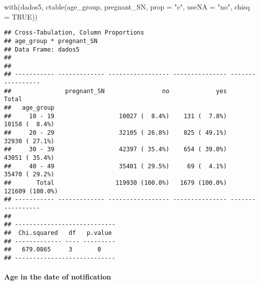 \documentclass[
]{article}
\newenvironment{Shaded}{\begin{snugshade}}{\end{snugshade}}
\newcommand{\AttributeTok}[1]{\textcolor[rgb]{0.77,0.63,0.00}{#1}}
\newcommand{\ConstantTok}[1]{\textcolor[rgb]{0.00,0.00,0.00}{#1}}
\newcommand{\DecValTok}[1]{\textcolor[rgb]{0.00,0.00,0.81}{#1}}
\newcommand{\FunctionTok}[1]{\textcolor[rgb]{0.00,0.00,0.00}{#1}}
\newcommand{\NormalTok}[1]{#1}
\newcommand{\OtherTok}[1]{\textcolor[rgb]{0.56,0.35,0.01}{#1}}
\newcommand{\SpecialCharTok}[1]{\textcolor[rgb]{0.00,0.00,0.00}{#1}}
\newcommand{\StringTok}[1]{\textcolor[rgb]{0.31,0.60,0.02}{#1}}
\begin{document}
\begin{Shaded}
\begin{Highlighting}[]
\FunctionTok{with}\NormalTok{(dados5, }\FunctionTok{ctable}\NormalTok{(age\_group, pregnant\_SN, }\AttributeTok{prop =} \StringTok{"c"}\NormalTok{, }\AttributeTok{useNA =} \StringTok{"no"}\NormalTok{, }\AttributeTok{chisq =} \ConstantTok{TRUE}\NormalTok{))}
\end{Highlighting}
\end{Shaded}

\begin{verbatim}
## Cross-Tabulation, Column Proportions  
## age_group * pregnant_SN  
## Data Frame: dados5  
## 
## 
## ----------- ------------- ----------------- --------------- -----------------
##               pregnant_SN                no             yes             Total
##   age_group                                                                  
##     10 - 19                  10027 (  8.4%)    131 (  7.8%)    10158 (  8.4%)
##     20 - 29                  32105 ( 26.8%)    825 ( 49.1%)    32930 ( 27.1%)
##     30 - 39                  42397 ( 35.4%)    654 ( 39.0%)    43051 ( 35.4%)
##     40 - 49                  35401 ( 29.5%)     69 (  4.1%)    35470 ( 29.2%)
##       Total                 119930 (100.0%)   1679 (100.0%)   121609 (100.0%)
## ----------- ------------- ----------------- --------------- -----------------
## 
## ----------------------------
##  Chi.squared   df   p.value 
## ------------- ---- ---------
##   679.0865     3       0    
## ----------------------------
\end{verbatim}

\hypertarget{age-in-the-date-of-notification}{%
\paragraph{\texorpdfstring{{ Age in the date of notification
}}{ Age in the date of notification }}\label{age-in-the-date-of-notification}}

\begin{Shaded}
\end{Shaded}
\end{document}
